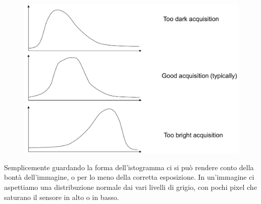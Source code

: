 \begin{figure}
	\vspace{-.6cm}
	\centering
	\includegraphics[width=.85\linewidth]{Picture/Histogram_Example}
\end{figure}
Semplicemente guardando la forma dell'istogramma ci si può rendere conto della bontà dell'immagine, o per lo meno della corretta esposizione. In un'immagine ci aspettiamo una distribuzione normale dai vari livelli di grigio, con pochi pixel che saturano il sensore in alto o in basso.

